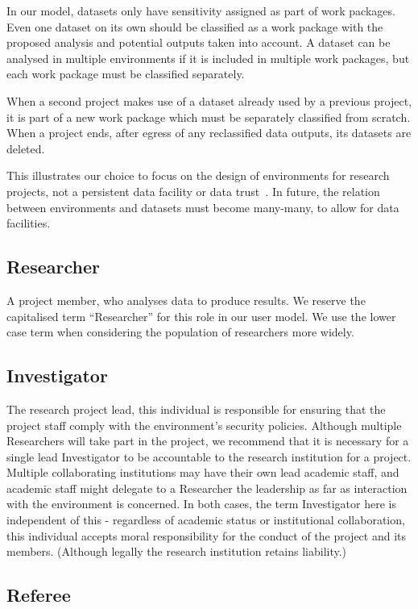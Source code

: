 \documentclass[10pt,a4paper,twocolumn]{article}
\begin{document}
In our model, datasets only have sensitivity assigned as part of work packages.  Even one dataset on its own should be classified as a work package with the proposed analysis and potential outputs taken into account. A dataset can be analysed in multiple environments if it is included in multiple work packages, but each work package must be classified separately.

When a second project makes use of a dataset already used by a previous project, it is part of a new work package which must be separately classified from scratch. When a project ends, after egress of any reclassified data outputs, its datasets are deleted.

This illustrates our choice to focus on the design of environments for research projects, not a persistent data facility or data trust~\cite{datatrust}.
In future, the relation between environments and datasets must become many-many, to allow for data facilities.

\subsection{Researcher}

A project member, who analyses data to produce results. We reserve the capitalised term ``Researcher'' for this role
in our user model. We use the lower case term when considering the population of researchers more widely.

\subsection{Investigator}

The research project lead, this individual is responsible for ensuring that the project staff comply with
the environment's security policies. Although multiple Researchers will take part in the project, we recommend that it is necessary for a single lead Investigator to be accountable to the research institution for a project. Multiple collaborating institutions may have
their own lead academic staff, and academic staff might delegate to a Researcher the leadership as far as interaction with the environment is concerned.
In both cases, the term Investigator here is independent of this - regardless of academic status or institutional collaboration, this individual accepts moral responsibility for the conduct of the project and its members. (Although legally the research institution retains liability.)

\subsection{Referee}
\end{document}
